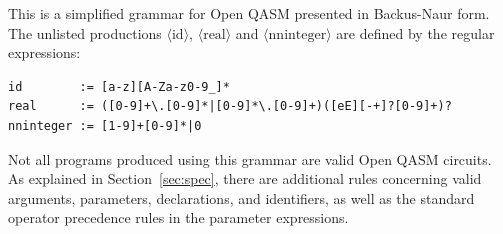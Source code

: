\documentclass[USenglish,12pt,fleqn]{article} %
\begin{document}
This is a simplified grammar for Open QASM presented in Backus-Naur form. The unlisted productions $\langle\mathrm{id}\rangle$, $\langle\mathrm{real}\rangle$ and $\langle\mathrm{nninteger}\rangle$ are defined by the regular expressions:
\begin{verbatim}
id        := [a-z][A-Za-z0-9_]*
real      := ([0-9]+\.[0-9]*|[0-9]*\.[0-9]+)([eE][-+]?[0-9]+)?
nninteger := [1-9]+[0-9]*|0
\end{verbatim}
Not all programs produced using this grammar are valid Open QASM circuits. As explained in Section~\ref{sec:spec}, there are additional rules concerning valid arguments, parameters, declarations, and identifiers, as well as the standard operator precedence rules in the parameter expressions.
             


\end{document}
